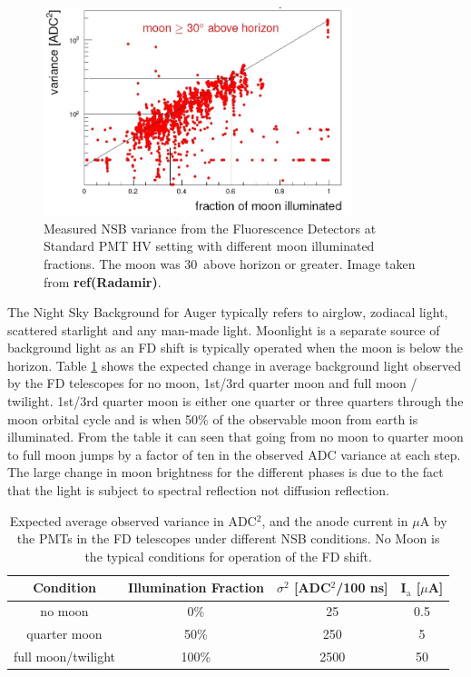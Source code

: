 \begin{figure}
\centering
\includegraphics[width=0.80\textwidth]{chapters/pix/SelEff/BGLoop_Variance_crop.jpg}
\caption{Measured NSB variance from the Fluorescence Detectors at Standard PMT HV setting with different moon illuminated fractions. The moon was 30\textdegree \ above horizon or greater. Image taken from \textbf{ref(Radamir)}.} \label{fig:ADCvarVSmoonIllumFrac}
\end{figure}

The Night Sky Background for Auger typically refers to airglow, zodiacal light, scattered starlight and any man-made light. Moonlight is a separate source of background light as an FD shift is typically operated when the moon is below the horizon. Table \ref{tab:MoonLightADC} shows the expected change in average background light observed by the FD telescopes for no moon, 1st/3rd quarter moon and full moon / twilight. 1st/3rd quarter moon is either one quarter or three quarters through the moon orbital cycle and is when 50\% of the observable moon from earth is illuminated. From the table it can seen that going from no moon to quarter moon to full moon jumps by a factor of ten in the observed ADC variance at each step. The large change in moon brightness for the different phases is due to the fact that the light is subject to spectral reflection not diffusion reflection.

\begin{table}[h]
\centering
\begin{tabular}{c c c c}
\hline\hline
Condition & Illumination Fraction & $\sigma^2$ [ADC$^2$/100 ns] & I$_{\mathrm{a}}$ [$\mu$A] \\ \hline\hline
no moon & 0\% & 25 & 0.5 \\
quarter moon & 50\% & 250 & 5 \\
full moon/twilight & 100\% & 2500 & 50 \\ 
\hline\hline
\end{tabular}
\caption{Expected average observed variance in ADC$^2$, and the anode current in $\mu$A by the PMTs in the FD telescopes under different NSB conditions. No Moon is the typical conditions for operation of the FD shift.} \label{tab:MoonLightADC}
\end{table} 

